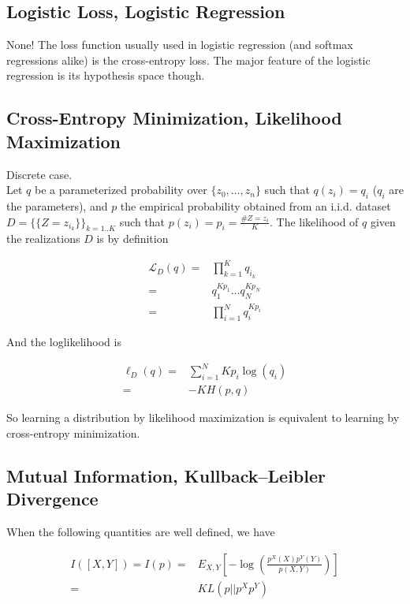 \documentclass{article}
\begin{document}
\subsection{Logistic Loss, Logistic Regression}

None! The loss function usually used in logistic regression (and softmax regressions alike) is the cross-entropy loss. The major feature of the logistic regression is its hypothesis space though.




\subsection{Cross-Entropy Minimization, Likelihood Maximization}

Discrete case.\\
Let $q$ be a parameterized probability over $\{z_0, \dots, z_n\}$ such that $q(z_i) = q_i$ ($q_i$ are the parameters), and $p$ the empirical probability obtained from an i.i.d. dataset $D = \big \{\{Z = z_{i_k}\} \big \}_{k=1..K}$ such that $p(z_i) = p_i = \frac{\#Z=z_i}{K}$. The likelihood of $q$ given the realizations $D$ is by definition

\begin{eqnarray*}
	\mathcal{L}_D(q) =&    \prod_{k=1}^K q_{i_k}  \\
	        =&  q_1^{Kp_1} \dots q_N ^ {Kp_N} \\
	        =& \prod_{i=1}^N q_i^{Kp_i}
\end{eqnarray*}

And the loglikelihood is

\begin{eqnarray*}
	\ell_D(q) =&  \sum_{i=1}^N K p_i \log(q_i) \\
	        	=& -K  H(p,q)
\end{eqnarray*}

So learning a distribution by  likelihood maximization is equivalent to learning by cross-entropy minimization.



\subsection{Mutual Information,  Kullback–Leibler Divergence}

When the following quantities are well defined, we have

\begin{eqnarray*}
    I([X,Y]) = I(p) =& E_{X,Y}[-\log(\frac{p^X(X)p^Y(Y)}{p(X,Y)})] \\
=& KL(p||p^X p^Y) \\
\end{eqnarray*}
\end{document}
